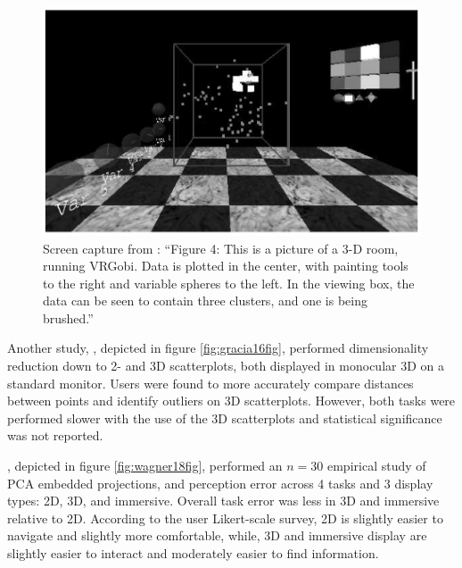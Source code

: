 \documentclass{monashthesis}
\begin{document}
\begin{figure}

{\centering \includegraphics[width=0.7\linewidth]{./figures/nelson98fig} 

}

\caption{Screen capture from \textcite{nelson_xgobi_1998}:
``Figure 4: This is a picture of a 3-D room, running VRGobi. Data is
plotted in the center, with painting tools to the right and variable
spheres to the left. In the viewing box, the data can be seen to contain
three clusters, and one is being brushed.''}\label{fig:nelson98fig}
\end{figure}

Another study, \textcite{gracia_new_2016}, depicted in figure
\ref{fig:gracia16fig}, performed dimensionality reduction down to 2- and
3D scatterplots, both displayed in monocular 3D on a standard monitor.
Users were found to more accurately compare distances between points and
identify outliers on 3D scatterplots. However, both tasks were performed
slower with the use of the 3D scatterplots and statistical significance
was not reported.

\textcite{wagner_filho_immersive_2018}, depicted in figure
\ref{fig:wagner18fig}, performed an \(n=30\) empirical study of PCA
embedded projections, and perception error across 4 tasks and 3 display
types: 2D, 3D, and immersive. Overall task error was less in 3D and
immersive relative to 2D. According to the user Likert-scale survey, 2D
is slightly easier to navigate and slightly more comfortable, while, 3D
and immersive display are slightly easier to interact and moderately
easier to find information.
\end{document}

